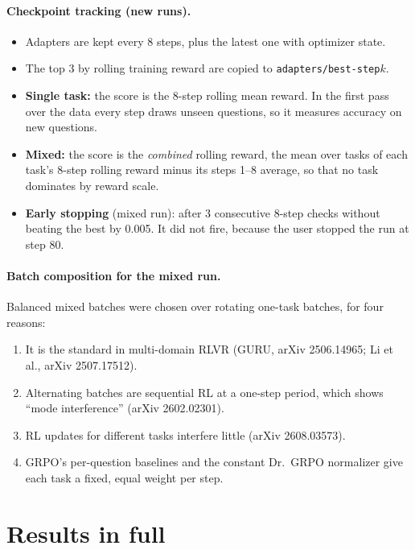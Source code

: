 \documentclass[10pt,a4paper]{article}
\begin{document}
\paragraph{Checkpoint tracking (new runs).}
\begin{itemize}
\item Adapters are kept every 8 steps, plus the latest one with optimizer state.
\item The top 3 by rolling training reward are copied to \texttt{adapters/best-step$k$}.
\item \textbf{Single task:} the score is the 8-step rolling mean reward. In the first pass over the data every step
      draws unseen questions, so it measures accuracy on new questions.
\item \textbf{Mixed:} the score is the \emph{combined} rolling reward, the mean over tasks of each task's 8-step
      rolling reward minus its steps 1--8 average, so that no task dominates by reward scale.
\item \textbf{Early stopping} (mixed run): after 3 consecutive 8-step checks without beating the best by 0.005. It
      did not fire, because the user stopped the run at step 80.
\end{itemize}

\paragraph{Batch composition for the mixed run.}
Balanced mixed batches were chosen over rotating one-task batches, for four reasons:
\begin{enumerate}
\item It is the standard in multi-domain RLVR (GURU, arXiv 2506.14965; Li et al., arXiv 2507.17512).
\item Alternating batches are sequential RL at a one-step period, which shows ``mode interference'' (arXiv
      2602.02301).
\item RL updates for different tasks interfere little (arXiv 2608.03573).
\item GRPO's per-question baselines and the constant Dr.~GRPO normalizer give each task a fixed, equal weight per
      step.
\end{enumerate}

\section{Results in full}
\end{document}
